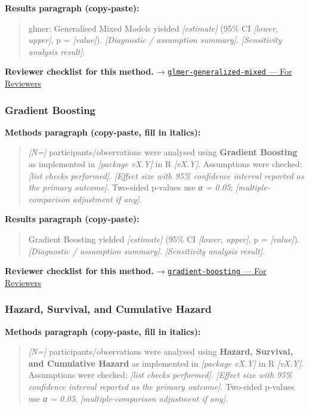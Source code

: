 \documentclass[
]{article}
\begin{document}
\textbf{Results paragraph (copy-paste):}

\begin{quote}
glmer: Generalised Mixed Models yielded \emph{{[}estimate{]}} (95\% CI
\emph{{[}lower, upper{]}}, p = \emph{{[}value{]}}). \emph{{[}Diagnostic
/ assumption summary{]}}. \emph{{[}Sensitivity analysis result{]}}.
\end{quote}

\textbf{Reviewer checklist for this method.} →
\href{../chapters/07-regression/glmer-generalized-mixed.Rmd\#for-reviewers}{\texttt{glmer-generalized-mixed}
--- For Reviewers}

\subsubsection{Gradient Boosting}\label{gradient-boosting}

\textbf{Methods paragraph (copy-paste, fill in italics):}

\begin{quote}
\emph{{[}N={]}} participants/observations were analysed using
\textbf{Gradient Boosting} as implemented in \emph{{[}package vX.Y{]}}
in R \emph{{[}vX.Y{]}}. Assumptions were checked: \emph{{[}list checks
performed{]}}. \emph{{[}Effect size with 95\% confidence interval
reported as the primary outcome{]}}. Two-sided p-values use \emph{α =
0.05}; \emph{{[}multiple-comparison adjustment if any{]}}.
\end{quote}

\textbf{Results paragraph (copy-paste):}

\begin{quote}
Gradient Boosting yielded \emph{{[}estimate{]}} (95\% CI \emph{{[}lower,
upper{]}}, p = \emph{{[}value{]}}). \emph{{[}Diagnostic / assumption
summary{]}}. \emph{{[}Sensitivity analysis result{]}}.
\end{quote}

\textbf{Reviewer checklist for this method.} →
\href{../chapters/13-ml/gradient-boosting.Rmd\#for-reviewers}{\texttt{gradient-boosting}
--- For Reviewers}

\subsubsection{Hazard, Survival, and Cumulative
Hazard}\label{hazard-survival-and-cumulative-hazard}

\textbf{Methods paragraph (copy-paste, fill in italics):}

\begin{quote}
\emph{{[}N={]}} participants/observations were analysed using
\textbf{Hazard, Survival, and Cumulative Hazard} as implemented in
\emph{{[}package vX.Y{]}} in R \emph{{[}vX.Y{]}}. Assumptions were
checked: \emph{{[}list checks performed{]}}. \emph{{[}Effect size with
95\% confidence interval reported as the primary outcome{]}}. Two-sided
p-values use \emph{α = 0.05}; \emph{{[}multiple-comparison adjustment if
any{]}}.
\end{quote}
\end{document}
